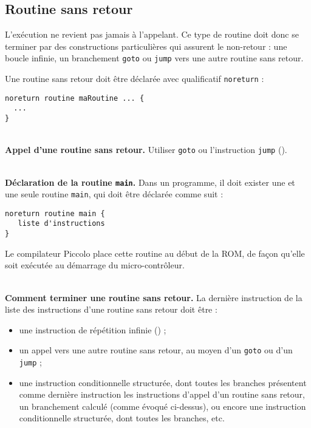 \subsection{Routine sans retour}

L’exécution ne revient pas jamais à l’appelant. Ce type de routine doit donc se terminer par des constructions particulières qui assurent le non-retour : une boucle infinie, un branchement \texttt{goto} ou \texttt{jump} vers une autre routine sans retour.

Une routine sans retour doit être déclarée avec qualificatif \texttt{noreturn} :
\begin{lstlisting}[language=piccolo]
noreturn routine maRoutine ... {
  ...
}
\end{lstlisting}

~\\
\textbf{Appel d’une routine sans retour.} Utiliser \texttt{goto} ou l'instruction \texttt{jump} ().


~\\
\textbf{Déclaration de la routine \texttt{main}.} Dans un programme, il doit exister une et une seule routine \texttt{main}, qui doit être déclarée comme suit :

\begin{lstlisting}[language=piccolo]
noreturn routine main {
   liste d'instructions
}

\end{lstlisting}

Le compilateur Piccolo place cette routine au début de la ROM, de façon qu'elle soit exécutée au démarrage du micro-contrôleur.


~\\
\textbf{Comment terminer une routine sans retour.} La dernière instruction de la liste des instructions d’une routine sans retour doit être :
\begin{itemize}
  \item une instruction de répétition infinie () ;
  \item un appel vers une autre routine sans retour, au moyen d’un \texttt{goto} ou d'un \texttt{jump} ;
  \item une instruction conditionnelle structurée, dont toutes les branches présentent comme dernière instruction les instructions d’appel d’un routine sans retour, un branchement calculé (comme évoqué ci-dessus), ou encore une instruction conditionnelle structurée, dont toutes les branches, etc.

\end{itemize}

